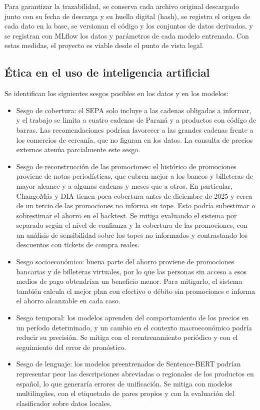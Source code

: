 \documentclass[
11pt, %
]{charter}
\begin{document}
Para garantizar la trazabilidad, se conserva cada archivo original descargado junto con su fecha de descarga y su huella digital (hash), se registra el origen de cada dato en la base, se versionan el código y los conjuntos de datos derivados, y se registran con MLflow los datos y parámetros de cada modelo entrenado. Con estas medidas, el proyecto es viable desde el punto de vista legal.

\subsection{Ética en el uso de inteligencia artificial}

Se identifican los siguientes sesgos posibles en los datos y en los modelos:

\begin{itemize}
	\item Sesgo de cobertura: el SEPA solo incluye a las cadenas obligadas a informar, y el trabajo se limita a cuatro cadenas de Paraná y a productos con código de barras. Las recomendaciones podrían favorecer a las grandes cadenas frente a los comercios de cercanía, que no figuran en los datos. La consulta de precios externos atenúa parcialmente este sesgo.
	\item Sesgo de reconstrucción de las promociones: el histórico de promociones proviene de notas periodísticas, que cubren mejor a los bancos y billeteras de mayor alcance y a algunas cadenas y meses que a otros. En particular, ChangoMás y DIA tienen poca cobertura antes de diciembre de 2025 y cerca de un tercio de las promociones no informa su tope. Esto podría subestimar o sobrestimar el ahorro en el backtest. Se mitiga evaluando el sistema por separado según el nivel de confianza y la cobertura de las promociones, con un análisis de sensibilidad sobre los topes no informados y contrastando los descuentos con tickets de compra reales.
	\item Sesgo socioeconómico: buena parte del ahorro proviene de promociones bancarias y de billeteras virtuales, por lo que las personas sin acceso a esos medios de pago obtendrían un beneficio menor. Para mitigarlo, el sistema también calcula el mejor plan con efectivo o débito sin promociones e informa el ahorro alcanzable en cada caso.
	\item Sesgo temporal: los modelos aprenden del comportamiento de los precios en un período determinado, y un cambio en el contexto macroeconómico podría reducir su precisión. Se mitiga con el reentrenamiento periódico y con el seguimiento del error de pronóstico.
	\item Sesgo de lenguaje: los modelos preentrenados de Sentence-BERT podrían representar peor las descripciones abreviadas o regionales de los productos en español, lo que generaría errores de unificación. Se mitiga con modelos multilingües, con el etiquetado de pares propios y con la evaluación del clasificador sobre datos locales.
\end{itemize}
\end{document}
